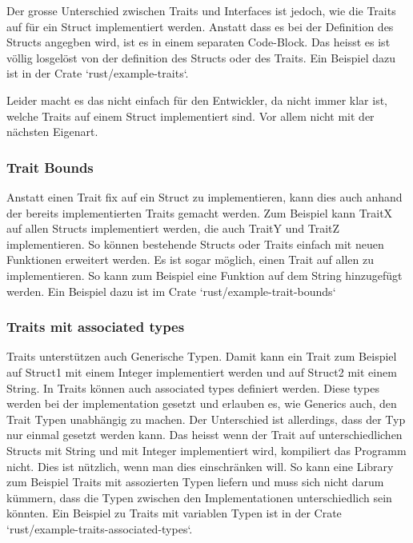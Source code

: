 \documentclass[letterpaper,12pt]{article}
\begin{document}
    Der grosse Unterschied zwischen Traits und Interfaces ist jedoch, wie die Traits auf für ein Struct implementiert werden.
    Anstatt dass es bei der Definition des Structs angegben wird, ist es in einem separaten Code-Block.
    Das heisst es ist völlig losgelöst von der definition des Structs oder des Traits.
    Ein Beispiel dazu ist in der Crate `rust/example-traits`.

    Leider macht es das nicht einfach für den Entwickler, da nicht immer klar ist, welche Traits auf einem Struct implementiert sind.
    Vor allem nicht mit der nächsten Eigenart.

    \subsubsection{Trait Bounds}\label{subsubsec:trait-bounds}
    Anstatt einen Trait fix auf ein Struct zu implementieren, kann dies auch anhand der bereits implementierten Traits gemacht werden.
    Zum Beispiel kann TraitX auf allen Structs implementiert werden, die auch TraitY und TraitZ implementieren.
    So können bestehende Structs oder Traits einfach mit neuen Funktionen erweitert werden.
    Es ist sogar möglich, einen Trait auf allen zu implementieren.
    So kann zum Beispiel eine Funktion auf dem String hinzugefügt werden.
    Ein Beispiel dazu ist im Crate `rust/example-trait-bounds`

    \subsubsection{Traits mit associated types}\label{subsubsec:traits-associated-types}
    Traits unterstützen auch Generische Typen.
    Damit kann ein Trait zum Beispiel auf Struct1 mit einem Integer implementiert werden und auf Struct2 mit einem String.
    In Traits können auch associated types definiert werden.
    Diese types werden bei der implementation gesetzt und erlauben es, wie Generics auch, den Trait Typen unabhängig zu machen.
    Der Unterschied ist allerdings, dass der Typ nur einmal gesetzt werden kann.
    Das heisst wenn der Trait auf unterschiedlichen Structs mit String und mit Integer implementiert wird, kompiliert das Programm nicht.
    Dies ist nützlich, wenn man dies einschränken will.
    So kann eine Library zum Beispiel Traits mit assozierten Typen liefern und muss sich nicht darum kümmern,
        dass die Typen zwischen den Implementationen unterschiedlich sein könnten.
    Ein Beispiel zu Traits mit variablen Typen ist in der Crate `rust/example-traits-associated-types`.
\end{document}
